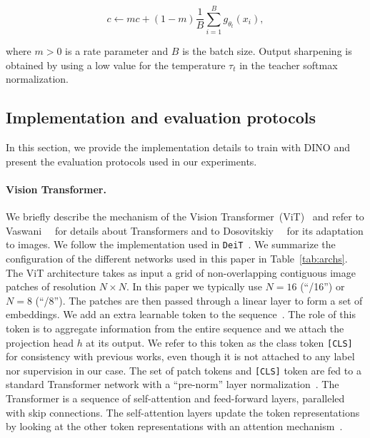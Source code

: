 \begin{equation}
c \leftarrow m c + (1-m) \frac{1}{B} \sum_{i=1}^B g_{\theta_t}(x_i),
\label{eq:center_update}
\end{equation}

where $m>0$ is a rate parameter and $B$ is the batch size. Output sharpening is obtained by using a low value for the temperature $\tau_t$ in the teacher softmax normalization.

\subsection{Implementation and evaluation protocols} In this section, we provide the implementation details to train with DINO and present the evaluation protocols used in our experiments.

\paragraph{Vision Transformer.} We briefly describe the mechanism of the Vision Transformer~(ViT)~\cite{dosovitskiy2020image,vaswani2017attention} and refer to Vaswani~\etal~\cite{vaswani2017attention} for details about Transformers and to Dosovitskiy~\etal~\cite{dosovitskiy2020image} for its adaptation to images. We follow the implementation used in \texttt{DeiT}~\cite{touvron2020training}.
We summarize the configuration of the different networks used in this paper in Table~\ref{tab:archs}.
The ViT architecture takes as input a grid of non-overlapping contiguous image patches of resolution $N \times N$. In this paper we typically use $N=16$ (``/16'') or $N=8$ (``/8''). The patches are then passed through a linear layer to form a set of embeddings. We add an extra learnable token to the sequence~\cite{devlin2018bert,dosovitskiy2020image}. The role of this token is to aggregate information from the entire sequence and we attach the projection head $h$ at its output. We refer to this token as the class token \texttt{[CLS]} for consistency with previous works\cite{devlin2018bert,dosovitskiy2020image,touvron2020training}, even though it is not attached to any label nor supervision in our case. The set of patch tokens and \texttt{[CLS]} token are fed to a standard Transformer network with a ``pre-norm'' layer normalization~\cite{chen2018best,klein2017opennmt}. The Transformer is a sequence of self-attention and feed-forward layers, paralleled with skip connections. The self-attention layers update the token representations by looking at the other token representations with an attention mechanism~\cite{bahdanau2014neural}.

